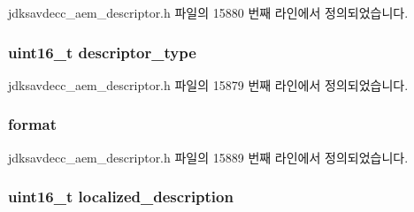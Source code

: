 jdksavdecc\+\_\+aem\+\_\+descriptor.\+h 파일의 15880 번째 라인에서 정의되었습니다.

\subsubsection[{\texorpdfstring{descriptor\+\_\+type}{descriptor_type}}]{\setlength{\rightskip}{0pt plus 5cm}uint16\+\_\+t descriptor\+\_\+type}\hypertarget{structjdksavdecc__descriptor__audio__cluster_ab7c32b6c7131c13d4ea3b7ee2f09b78d}{}\label{structjdksavdecc__descriptor__audio__cluster_ab7c32b6c7131c13d4ea3b7ee2f09b78d}


jdksavdecc\+\_\+aem\+\_\+descriptor.\+h 파일의 15879 번째 라인에서 정의되었습니다.

\subsubsection[{\texorpdfstring{format}{format}}]{ format}\hypertarget{structjdksavdecc__descriptor__audio__cluster_a7864fd50d470f893524181b4a59d9828}{}\label{structjdksavdecc__descriptor__audio__cluster_a7864fd50d470f893524181b4a59d9828}


jdksavdecc\+\_\+aem\+\_\+descriptor.\+h 파일의 15889 번째 라인에서 정의되었습니다.

\subsubsection[{\texorpdfstring{localized\+\_\+description}{localized_description}}]{\setlength{\rightskip}{0pt plus 5cm}uint16\+\_\+t localized\+\_\+description}\hypertarget{structjdksavdecc__descriptor__audio__cluster_a0926f846ca65a83ad5bb06b4aff8f408}{}\label{structjdksavdecc__descriptor__audio__cluster_a0926f846ca65a83ad5bb06b4aff8f408}


